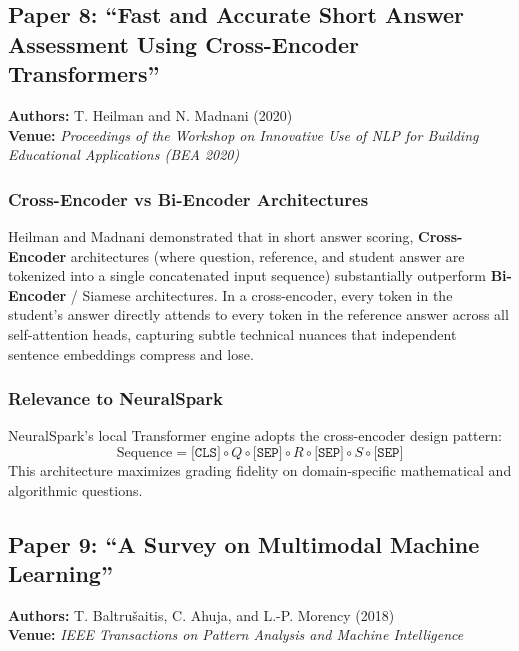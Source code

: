 \subsection{Paper 8: ``Fast and Accurate Short Answer Assessment Using Cross-Encoder Transformers''}
\textbf{Authors:} T. Heilman and N. Madnani (2020) \cite{heilman2020} \\
\textbf{Venue:} \textit{Proceedings of the Workshop on Innovative Use of NLP for Building Educational Applications (BEA 2020)}

\subsubsection{Cross-Encoder vs Bi-Encoder Architectures}
Heilman and Madnani demonstrated that in short answer scoring, \textbf{Cross-Encoder} architectures (where question, reference, and student answer are tokenized into a single concatenated input sequence) substantially outperform \textbf{Bi-Encoder} / Siamese architectures. In a cross-encoder, every token in the student's answer directly attends to every token in the reference answer across all self-attention heads, capturing subtle technical nuances that independent sentence embeddings compress and lose.

\subsubsection{Relevance to NeuralSpark}
NeuralSpark's local Transformer engine adopts the cross-encoder design pattern:
\begin{equation}
    \text{Sequence} = \texttt{[CLS]} \circ Q \circ \texttt{[SEP]} \circ R \circ \texttt{[SEP]} \circ S \circ \texttt{[SEP]}
\end{equation}
This architecture maximizes grading fidelity on domain-specific mathematical and algorithmic questions.

\subsection{Paper 9: ``A Survey on Multimodal Machine Learning''}
\textbf{Authors:} T. Baltru\v{s}aitis, C. Ahuja, and L.-P. Morency (2018) \cite{baltrusaitis2018} \\
\textbf{Venue:} \textit{IEEE Transactions on Pattern Analysis and Machine Intelligence}

